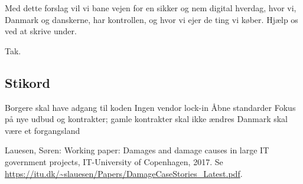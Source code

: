 \documentclass[fleqn]{article}
\begin{document}
\vskip10pt
Med dette forslag vil vi bane vejen for en sikker og nem digital
hverdag, hvor vi, Danmark og danskerne, har kontrollen, og hvor vi ejer de ting vi køber.
Hjælp os ved at skrive under.

\vskip10pt
Tak.

\subsection{Stikord}
Borgere skal have adgang til koden
Ingen vendor lock-in
Åbne standarder
Fokus på nye udbud og kontrakter; gamle kontrakter skal ikke ændres
Danmark skal være et forgangsland

\begin{thebibliography}{1}

 Lauesen, Søren: Working paper: Damages and damage causes in
large IT government projects, IT-University of Copenhagen, 2017. Se
\url{https://itu.dk/~slauesen/Papers/DamageCaseStories_Latest.pdf}.
\end{thebibliography}
\end{document}
